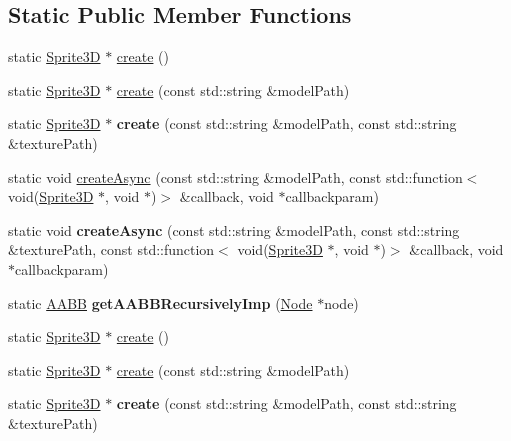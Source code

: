 \subsection*{Static Public Member Functions}
\begin{DoxyCompactItemize}
\item 
static \hyperlink{classSprite3D}{Sprite3D} $\ast$ \hyperlink{classSprite3D_a10905e0480bfcf875882a9ad7b538d78}{create} ()
\item 
static \hyperlink{classSprite3D}{Sprite3D} $\ast$ \hyperlink{classSprite3D_ab739633591bc691de054e3a5b9a25c32}{create} (const std\+::string \&model\+Path)
\item 
\mbox{\label{classSprite3D_a9968b9e6d617d872a1938a2a2cc81d32}} 
static \hyperlink{classSprite3D}{Sprite3D} $\ast$ {\bfseries create} (const std\+::string \&model\+Path, const std\+::string \&texture\+Path)
\item 
static void \hyperlink{classSprite3D_adcb309ed399180c52eb0e6fc2cf53cef}{create\+Async} (const std\+::string \&model\+Path, const std\+::function$<$ void(\hyperlink{classSprite3D}{Sprite3D} $\ast$, void $\ast$)$>$ \&callback, void $\ast$callbackparam)
\item 
\mbox{\label{classSprite3D_a6948c8f68306b4f9ac7ecdac27df09bc}} 
static void {\bfseries create\+Async} (const std\+::string \&model\+Path, const std\+::string \&texture\+Path, const std\+::function$<$ void(\hyperlink{classSprite3D}{Sprite3D} $\ast$, void $\ast$)$>$ \&callback, void $\ast$callbackparam)
\item 
\mbox{\label{classSprite3D_a3fa5f076f182c7799e83bb6eec2bbffc}} 
static \hyperlink{classAABB}{A\+A\+BB} {\bfseries get\+A\+A\+B\+B\+Recursively\+Imp} (\hyperlink{classNode}{Node} $\ast$node)
\item 
static \hyperlink{classSprite3D}{Sprite3D} $\ast$ \hyperlink{classSprite3D_ac266874371868d5fc125a45fcf31cf6c}{create} ()
\item 
static \hyperlink{classSprite3D}{Sprite3D} $\ast$ \hyperlink{classSprite3D_ab8a42bf2fab8845ead145605c25f1731}{create} (const std\+::string \&model\+Path)
\item 
\mbox{\label{classSprite3D_aac4f8e1d41d75d574df98b487eccaf97}} 
static \hyperlink{classSprite3D}{Sprite3D} $\ast$ {\bfseries create} (const std\+::string \&model\+Path, const std\+::string \&texture\+Path)

\end{DoxyCompactItemize}
